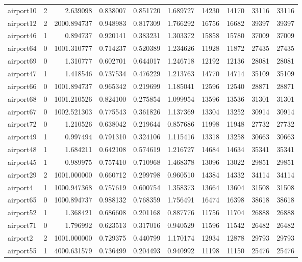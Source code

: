 \begin{longtable}{|l|r|r|r|r|r|r|r|r|r|}
airport10 & 2 & 2.639098 & 0.838007 & 0.851720 & 1.689727 & 14230 & 14170 & 33116 & 33116 \\
airport12 & 2 & 2000.894737 & 0.948983 & 0.817309 & 1.766292 & 16756 & 16682 & 39397 & 39397 \\
airport46 & 1 & 0.894737 & 0.920141 & 0.383231 & 1.303372 & 15858 & 15780 & 37009 & 37009 \\
airport64 & 0 & 1001.310777 & 0.714237 & 0.520389 & 1.234626 & 11928 & 11872 & 27435 & 27435 \\
airport69 & 0 & 1.310777 & 0.602701 & 0.644017 & 1.246718 & 12192 & 12136 & 28081 & 28081 \\
airport47 & 1 & 1.418546 & 0.737534 & 0.476229 & 1.213763 & 14770 & 14714 & 35109 & 35109 \\
airport66 & 0 & 1001.894737 & 0.965342 & 0.219699 & 1.185041 & 12596 & 12540 & 28871 & 28871 \\
airport68 & 0 & 1001.210526 & 0.824100 & 0.275854 & 1.099954 & 13596 & 13536 & 31301 & 31301 \\
airport67 & 0 & 1002.521303 & 0.775543 & 0.361826 & 1.137369 & 13304 & 13252 & 30914 & 30914 \\
airport72 & 0 & 1.210526 & 0.638042 & 0.219644 & 0.857686 & 11998 & 11948 & 27732 & 27732 \\
airport49 & 1 & 0.997494 & 0.791310 & 0.324106 & 1.115416 & 13318 & 13258 & 30663 & 30663 \\
airport48 & 1 & 1.684211 & 0.642108 & 0.574619 & 1.216727 & 14684 & 14634 & 35341 & 35341 \\
airport45 & 1 & 0.989975 & 0.757410 & 0.710968 & 1.468378 & 13096 & 13022 & 29851 & 29851 \\
airport29 & 2 & 1001.000000 & 0.660712 & 0.299798 & 0.960510 & 14384 & 14332 & 34114 & 34114 \\
airport4 & 1 & 1000.947368 & 0.757619 & 0.600754 & 1.358373 & 13664 & 13604 & 31508 & 31508 \\
airport65 & 0 & 1000.894737 & 0.988132 & 0.768359 & 1.756491 & 16474 & 16398 & 38618 & 38618 \\
airport52 & 1 & 1.368421 & 0.686608 & 0.201168 & 0.887776 & 11756 & 11704 & 26888 & 26888 \\
airport71 & 0 & 1.796992 & 0.623513 & 0.317016 & 0.940529 & 11596 & 11542 & 26482 & 26482 \\
airport2 & 2 & 1001.000000 & 0.729375 & 0.440799 & 1.170174 & 12934 & 12878 & 29793 & 29793 \\
airport55 & 1 & 4000.631579 & 0.736499 & 0.204493 & 0.940992 & 11198 & 11150 & 25476 & 25476 \\

\end{longtable}
